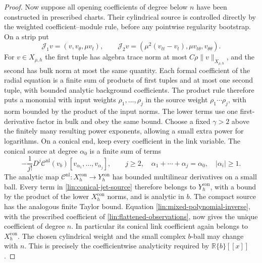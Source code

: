 \begin{proof}
Now suppose all opening coefficients of degree below $n$ have been
constructed in prescribed charts.  Their cylindrical source is controlled
directly by the weighted coefficient--module rule, before any pointwise
regularity bootstrap.  On a strip put
\[
 \mathcal J_1v=(v,v_\theta,\mu v_t),\qquad
 \mathcal J_2v=(\mu^2(v_{tt}-v_t),\mu v_{t\theta},v_{\theta\theta}).
\]
For $v\in X_{\rho,h}$ the first tuple has algebra trace norm at most
$C\rho\|v\|_{X_{\rho,h}}$, and the second has bulk norm at most the same
quantity.  Each formal coefficient of the radial equation is a finite sum
of products of first tuples and at most one second tuple, with bounded
analytic background coefficients.  The product rule therefore puts a
monomial with input weights $\rho_1,\ldots,\rho_j$ in the source weight
$\rho_1\cdots\rho_j$, with norm bounded by the product of the input norms.
The lower terms use one first-derivative factor in bulk and obey the same
bound.  Choose a fixed $\gamma>2$ above the finitely many resulting power
exponents, allowing a small extra power for logarithms.
On a conical end, keep every coefficient in the link variable.
The conical source at degree $\alpha_0$ is a finite sum of terms
\begin{equation}\label{lin:conical-jet-source}
 -\frac1{j!}D^j\mathcal C^{\mathrm{nl}}(v_b)
       [v_{\alpha_1},\ldots,v_{\alpha_j}],
 \qquad j\ge2,\quad
 \alpha_1+\cdots+\alpha_j=\alpha_0,\quad |\alpha_i|\ge1.
\end{equation}
The analytic map
$\mathcal C^{\mathrm{nl}}:X^{\mathrm{con}}_h\to Y^{\mathrm{con}}_h$ has bounded
multilinear derivatives on a small ball.  Every term in
\eqref{lin:conical-jet-source} therefore belongs to
$Y^{\mathrm{con}}_h$, with a bound by the product of the lower
$X^{\mathrm{con}}_h$ norms, and is analytic in $b$.
The compact source has the analogous finite Taylor bound.
Equation \eqref{lin:mixed-polynomial-inverse}, with the prescribed
coefficient of \eqref{lin:flattened-observations}, now gives the unique
coefficient of degree $n$.  In particular its conical link coefficient
again belongs to $X^{\mathrm{con}}_h$.  The chosen cylindrical weight
and the small complex $b$-ball may change with $n$.  This is precisely
the coefficientwise analyticity required by $\mathbb R\{b\}[[x]]$.


\end{proof}
